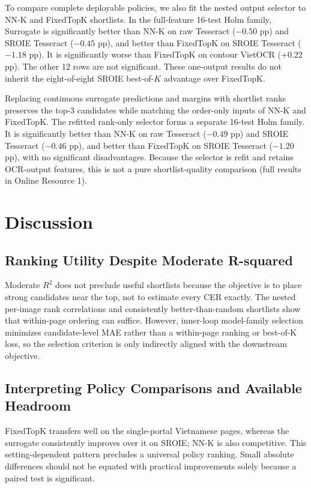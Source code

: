 \documentclass[pdflatex,sn-basic,Numbered,iicol]{sn-jnl}
\begin{document}
To compare complete deployable policies, we also fit the nested output selector to NN-K and FixedTopK shortlists. In the full-feature 16-test Holm family, Surrogate is significantly better than NN-K on raw Tesseract ($-0.50$ pp) and SROIE Tesseract ($-0.45$ pp), and better than FixedTopK on SROIE Tesseract ($-1.18$ pp). It is significantly worse than FixedTopK on contour VietOCR ($+0.22$ pp). The other 12 rows are not significant. These one-output results do not inherit the eight-of-eight SROIE best-of-$K$ advantage over FixedTopK.

Replacing continuous surrogate predictions and margins with shortlist ranks preserves the top-3 candidates while matching the order-only inputs of NN-K and FixedTopK. The refitted rank-only selector forms a separate 16-test Holm family. It is significantly better than NN-K on raw Tesseract ($-0.49$ pp) and SROIE Tesseract ($-0.46$ pp), and better than FixedTopK on SROIE Tesseract ($-1.20$ pp), with no significant disadvantages. Because the selector is refit and retains OCR-output features, this is not a pure shortlist-quality comparison (full results in Online Resource 1).

\section{Discussion}
\label{sec:discussion}

\subsection{Ranking Utility Despite Moderate R-squared}

Moderate $R^2$ does not preclude useful shortlists because the objective is to place strong candidates near the top, not to estimate every CER exactly. The nested per-image rank correlations and consistently better-than-random shortlists show that within-page ordering can suffice. However, inner-loop model-family selection minimizes candidate-level MAE rather than a within-page ranking or best-of-K loss, so the selection criterion is only indirectly aligned with the downstream objective.

\subsection{Interpreting Policy Comparisons and Available Headroom}

FixedTopK transfers well on the single-portal Vietnamese pages, whereas the surrogate consistently improves over it on SROIE; NN-K is also competitive. This setting-dependent pattern precludes a universal policy ranking. Small absolute differences should not be equated with practical improvements solely because a paired test is significant.
\end{document}
